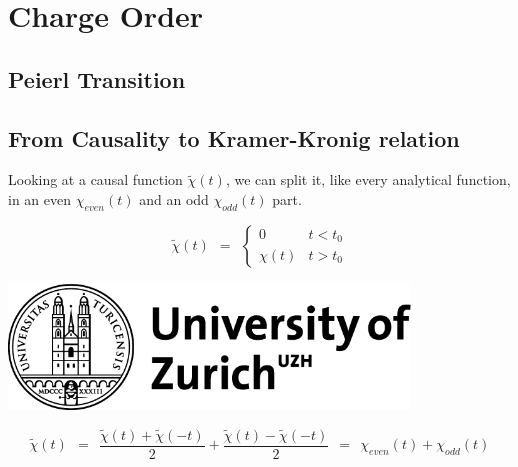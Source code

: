 \documentclass[10pt]{report}
\numberwithin{equation}{chapter}
\begin{document}

\chapter{Charge Order}

\section{Peierl Transition}


\section{From Causality to Kramer-Kronig relation}


Looking at a causal function $\tilde{\chi}(t)$, we can split it, like every analytical function, in an even $\chi_{even}(t)$ and an odd $\chi_{odd}(t)$ part.


\begin{minipage}{0.45\textwidth}
  \begin{equation*}
    \tilde{\chi}(t) ~~ = ~~ \left\{ \begin{array}{lc} 
      0        &  t < t_0 \\
      \chi(t)  &  t > t_0
    \end{array}\right.
  \end{equation*}
\end{minipage}
\begin{minipage}{0.1\textwidth}
\end{minipage}
\begin{minipage}{0.45\textwidth}
   \includegraphics[width=0.8\textwidth]{../img/uzh_logo}
\end{minipage}


\begin{equation} \label{eq:even_odd}
\tilde{\chi}(t) ~~ = ~~ \frac{\tilde{\chi}(t) + \tilde{\chi}(-t)}{2} + \frac{\tilde{\chi}(t) - \tilde{\chi}(-t)}{2} ~~ = ~~ \chi_{even}(t) + \chi_{odd}(t)
\end{equation}
\end{document}
